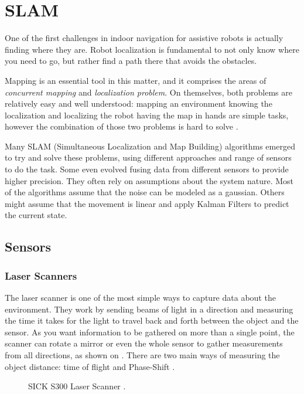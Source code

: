 \chapter{SLAM}\label{chp:slam_mapping}

One of the first challenges in indoor navigation for assistive robots is actually finding where they are. Robot localization is fundamental to not only know where you need to go, but rather find a path there that avoids the obstacles.

Mapping is an essential tool in this matter, and it comprises the areas of \textit{concurrent mapping} and \textit{localization problem}. On themselves, both problems are relatively easy and well understood: mapping an environment knowing the localization and localizing the robot having the map in hands are simple tasks, however the combination of those two problems is hard to solve \cite{thrun2000real}.

Many SLAM (Simultaneous Localization and
Map Building) algorithms emerged to try and solve these problems, using different approaches and range of sensors to do the task. Some even evolved fusing data from different sensors to provide higher precision. They often rely on assumptions about the system nature. Most of the algorithms assume that the noise can be modeled  as a gaussian. Others might assume that the movement is linear and apply Kalman Filters to predict the current state.

\section{Sensors}

\subsection{Laser Scanners}

The laser scanner is one of the most simple ways to capture data about the environment. They work by sending beams of light in a direction and measuring the time it takes for the light to travel back and forth between the object and the sensor. As you want information to be gathered on more than a single point, the scanner can rotate a mirror or even the whole sensor to gather measurements from all directions, as shown on . There are two main ways of measuring the object distance: time of flight and Phase-Shift \cite{amann2001laser}.

\begin{figure}
     \centering
     \caption{SICK S300 Laser Scanner \cite{sicks300}.}
     \label{fig:sick_s300}
\end{figure}

